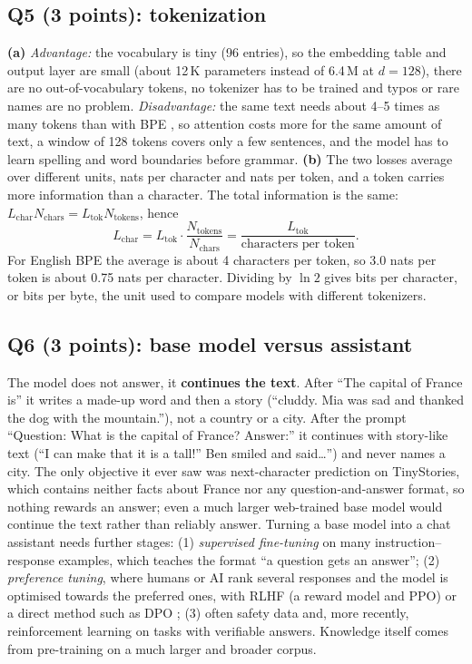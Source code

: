 \documentclass[10pt,twocolumn]{article}
\begin{document}
\subsection*{Q5 (3 points): tokenization}
\textbf{(a)} \emph{Advantage:} the vocabulary is tiny (96 entries), so the embedding table and output layer are small (about 12\,K parameters instead of 6.4\,M at $d=128$), there are no out-of-vocabulary tokens, no tokenizer has to be trained and typos or rare names are no problem. \emph{Disadvantage:} the same text needs about 4--5 times as many tokens than with BPE \cite{sennrich2016}, so attention costs more for the same amount of text, a window of 128 tokens covers only a few sentences, and the model has to learn spelling and word boundaries before grammar. \textbf{(b)} The two losses average over different units, nats per character and nats per token, and a token carries more information than a character. The total information is the same: $L_{\text{char}}N_{\text{chars}}=L_{\text{tok}}N_{\text{tokens}}$, hence
\begin{equation}
L_{\text{char}}=L_{\text{tok}}\cdot\frac{N_{\text{tokens}}}{N_{\text{chars}}}=\frac{L_{\text{tok}}}{\text{characters per token}}.
\end{equation}
For English BPE the average is about 4 characters per token, so 3.0 nats per token is about 0.75 nats per character. Dividing by $\ln2$ gives bits per character, or bits per byte, the unit used to compare models with different tokenizers.

\subsection*{Q6 (3 points): base model versus assistant}
The model does not answer, it \textbf{continues the text}. After ``The capital of France is'' it writes a made-up word and then a story (``cluddy. Mia was sad and thanked the dog with the mountain.''), not a country or a city. After the prompt ``Question: What is the capital of France? Answer:'' it continues with story-like text (``I can make that it is a tall!'' Ben smiled and said\ldots'') and never names a city. The only objective it ever saw was next-character prediction on TinyStories, which contains neither facts about France nor any question-and-answer format, so nothing rewards an answer; even a much larger web-trained base model would continue the text rather than reliably answer. Turning a base model into a chat assistant needs further stages: (1) \emph{supervised fine-tuning} on many instruction--response examples, which teaches the format ``a question gets an answer''; (2) \emph{preference tuning}, where humans or AI rank several responses and the model is optimised towards the preferred ones, with RLHF (a reward model and PPO) \cite{ouyang2022,schulman2017} or a direct method such as DPO \cite{rafailov2023}; (3) often safety data and, more recently, reinforcement learning on tasks with verifiable answers. Knowledge itself comes from pre-training on a much larger and broader corpus.
\end{document}
